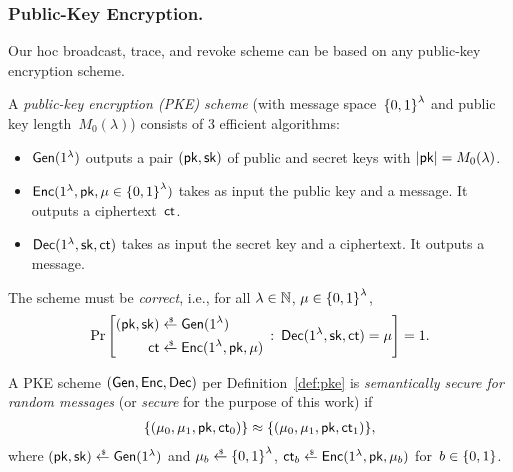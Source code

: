 \subsubsection{Public-Key Encryption.}
Our \ad hoc broadcast, trace, and revoke scheme can be based on any public-key encryption scheme.

\begin{definition}[PKE]\label{def:pke}
A \emph{public-key encryption (PKE) scheme} (with message space~${\{0,1\}}^\lambda$ and public key length~$M_0(\lambda)$)
consists of 3 efficient algorithms:
\begin{itemize}
\item $\Gen(1^\lambda)$ outputs a pair $(\pk,\sk)$ of public and secret keys
with ${|\pk|=M_0(\lambda)}$.
\item $\Enc(1^\lambda,\pk,\mu\in\bit^\lambda)$ takes as input the public key and a message.
It outputs a ciphertext~$\ct$.
\item $\Dec(1^\lambda,\sk,\ct)$ takes as input the secret key and a ciphertext.
It outputs a message.
\end{itemize}
The scheme must be \emph{correct}, i.e., for all
${\lambda\in{\mathbb{N}}}$,
${\mu\in{\{0,1\}}^\lambda}$,
\begin{align*}
\Pr\left[
\begin{aligned}
(\pk,\sk)&{}\draws\Gen(1^\lambda)\\
\ct&{}\draws\Enc(1^\lambda,\pk,\mu)
\end{aligned}
\::\:
\Dec(1^\lambda,\sk,\ct)=\mu
\right]=1.
\end{align*}
\end{definition}

\begin{definition}\label{def:pke-security}
A PKE scheme $(\Gen,\Enc,\Dec)$ per Definition~\ref{def:pke} is \emph{semantically secure for random messages} (or \emph{secure} for the purpose of this work) if
\begin{align*}
\{(\mu_0,\mu_1,\pk,\ct_0)\}\approx\{(\mu_0,\mu_1,\pk,\ct_1)\},
\end{align*}
where $(\pk,\sk)\draws\Gen(1^\lambda)$ and
${\mu_b\draws\bit^\lambda}$, ${\ct_b\draws\Enc(1^\lambda,\pk,\mu_b)}$ for~${b\in{\{0,1\}}}$.
\end{definition}
